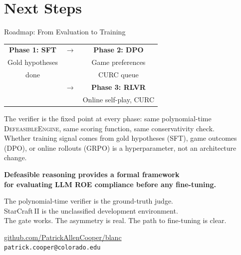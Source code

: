 \documentclass[aspectratio=169, 10pt]{beamer}
\begin{document}
\section{Next Steps}

\begin{frame}{Roadmap: From Evaluation to Training}

  \begin{center}
  \begin{center}
  \small
  \begin{tabular}{ccc}
    \textcolor{ROEGreen}{\textbf{Phase 1: SFT}} & $\to$ &
    \textcolor{ROERed}{\textbf{Phase 2: DPO}} \\
    Gold hypotheses & & Game preferences \\
    \textcolor{ROEGreen}{done} & & CURC queue \\
    & $\to$ & \textcolor{ROERed}{\textbf{Phase 3: RLVR}} \\
    & & Online self-play, CURC
  \end{tabular}
\end{center}
  \end{center}

  \vspace{0.3em}
  \small
  The verifier is the fixed point at every phase: same polynomial-time
  \textsc{DefeasibleEngine}, same scoring function, same conservativity check.\\
  Whether training signal comes from gold hypotheses (SFT), game outcomes (DPO),
  or online rollouts (GRPO) is a hyperparameter, not an architecture change.
\end{frame}

\begin{frame}[standout]
  \textbf{Defeasible reasoning provides a formal framework\\
          for evaluating LLM ROE compliance before any fine-tuning.}

  \vspace{0.8em}
  \large
  The polynomial-time verifier is the ground-truth judge.\\
  StarCraft\,II is the unclassified development environment.\\
  The gate works. The asymmetry is real. The path to fine-tuning is clear.

  \vspace{1.2em}
  \normalsize
  \url{github.com/PatrickAllenCooper/blanc}\\
  \texttt{patrick.cooper@colorado.edu}
\end{frame}
\end{document}

